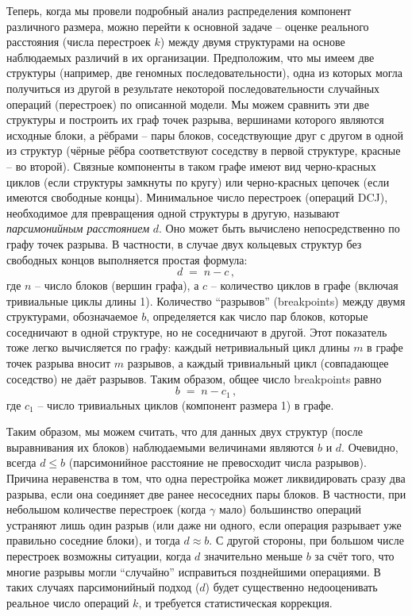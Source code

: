 Теперь, когда мы провели подробный анализ распределения компонент различного размера, можно перейти к основной задаче -- оценке реального расстояния (числа перестроек $k$) между двумя структурами на основе наблюдаемых различий в их организации.
Предположим, что мы имеем две структуры (например, две геномных последовательности), одна из которых могла получиться из другой в результате некоторой последовательности случайных операций (перестроек) по описанной модели.
Мы можем сравнить эти две структуры и построить их граф точек разрыва, вершинами которого являются исходные блоки, а рёбрами -- пары блоков, соседствующие друг с другом в одной из структур (чёрные рёбра соответствуют соседству в первой структуре, красные -- во второй).
Связные компоненты в таком графе имеют вид черно-красных циклов (если структуры замкнуты по кругу) или черно-красных цепочек (если имеются свободные концы).
Минимальное число перестроек (операций DCJ), необходимое для превращения одной структуры в другую, называют \emph{парсимонийным расстоянием} $d$. Оно может быть вычислено непосредственно по графу точек разрыва.
В частности, в случае двух кольцевых структур без свободных концов выполняется простая формула: 
\[
d \;=\; n - c\,,
\] 
где $n$ -- число блоков (вершин графа), а $c$ -- количество циклов в графе (включая тривиальные циклы длины 1).
Количество ``разрывов'' (breakpoints) между двумя структурами, обозначаемое $b$, определяется как число пар блоков, которые соседничают в одной структуре, но не соседничают в другой. Этот показатель тоже легко вычисляется по графу: каждый нетривиальный цикл длины $m$ в графе точек разрыва вносит $m$ разрывов, а каждый тривиальный цикл (совпадающее соседство) не даёт разрывов. Таким образом, общее число breakpoints равно 
\[
b \;=\; n - c_1\,,
\] 
где $c_1$ -- число тривиальных циклов (компонент размера 1) в графе.

Таким образом, мы можем считать, что для данных двух структур (после выравнивания их блоков) наблюдаемыми величинами являются $b$ и $d$. Очевидно, всегда $d \le b$ (парсимонийное расстояние не превосходит числа разрывов). Причина неравенства в том, что одна перестройка может ликвидировать сразу два разрыва, если она соединяет две ранее несоседних пары блоков. В частности, при небольшом количестве перестроек (когда $\gamma$ мало) большинство операций устраняют лишь один разрыв (или даже ни одного, если операция разрывает уже правильно соседние блоки), и тогда $d \approx b$. С другой стороны, при большом числе перестроек возможны ситуации, когда $d$ значительно меньше $b$ за счёт того, что многие разрывы могли ``случайно'' исправиться позднейшими операциями. В таких случаях парсимонийный подход ($d$) будет существенно недооценивать реальное число операций $k$, и требуется статистическая коррекция.

